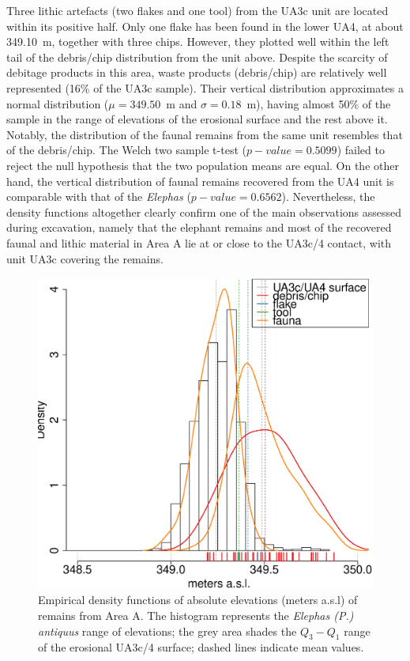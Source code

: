 \documentclass[preprint,authoryear,times]{elsarticle} %
\begin{document}
Three lithic artefacts (two flakes and one tool) from the UA3c unit are located within its positive half. Only one flake has been found in the lower UA4, at about 349.10~m, together with three chips. However, they plotted well within the left tail of the debris/chip distribution from the unit above. Despite the scarcity of debitage products in this area, waste products (debris/chip) are relatively well represented (16\% of the UA3c sample). Their vertical distribution approximates a normal distribution ($\mu=349.50$~m and $\sigma=0.18$~m), having almost 50\% of the sample in the range of elevations of the erosional surface and the rest above it. Notably, the distribution of the faunal remains from the same unit resembles that of the debris/chip. The Welch two sample t-test ($p-value=0.5099$) failed to reject the null hypothesis that the two population means are equal. On the other hand, the vertical distribution of faunal remains recovered from the UA4 unit is comparable with that of the \emph{Elephas} ($p-value=0.6562$).
Nevertheless, the density functions altogether clearly confirm one of the main observations assessed during excavation, namely that the elephant remains and most of the recovered faunal and lithic material in Area A lie at or close to the UA3c/4 contact, with unit UA3c covering the remains.

\begin{figure}[]
  \centering
  \includegraphics[width=1\textwidth]{../artwork/Fig9.eps}
  \caption{Empirical density functions of absolute elevations (meters a.s.l) of remains from Area A. The histogram represents the \emph{Elephas (P.) antiquus} range of elevations; the grey area shades the $Q_3-Q_1$ range of the erosional UA3c/4 surface; dashed lines indicate mean values.}
  \label{fig:9}
\end{figure}
\end{document}
